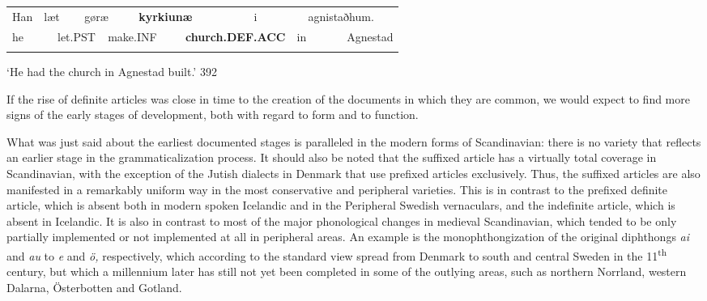 \begin{tabular}{llllllllllll}
\lsptoprule
Han & \multicolumn{2}{l}{læt

} & \multicolumn{2}{l}{gøræ

} & \multicolumn{2}{l}{{\bfseries kyrkiunæ}

} & \multicolumn{2}{l}{i

} & \multicolumn{2}{l}{agnistaðhum.

} & \\
\multicolumn{2}{l}{he

} & \multicolumn{2}{l}{let.PST

} & \multicolumn{2}{l}{make.INF

} & \multicolumn{2}{l}{{\bfseries church.DEF.ACC}

} & \multicolumn{2}{l}{in

} & \multicolumn{2}{l}{Agnestad

}\\
\lspbottomrule
\end{tabular}

\begin{styleTranslation}
‘He had the church in Agnestad built.’ 392

\end{styleTranslation}

\begin{styleBodytextC}
If the rise of definite articles was close in time to the creation of the documents in which they are common, we would expect to find more signs of the early stages of development, both with regard to form and to function.

\end{styleBodytextC}

\begin{styleBodytextC}
What was just said about the earliest documented stages is paralleled in the modern forms of Scandinavian: there is no variety that reflects an earlier stage in the grammaticalization process. It should also be noted that the suffixed article has a virtually total coverage in Scandinavian, with the exception of the Jutish dialects in Denmark that use prefixed articles exclusively. Thus, the suffixed articles are also manifested in a remarkably uniform way in the most conservative and peripheral varieties. This is in contrast to the prefixed definite article, which is absent both in modern spoken Icelandic and in the Peripheral Swedish vernaculars, and the indefinite article, which is absent in Icelandic. It is also in contrast to most of the major phonological changes in medieval Scandinavian, which tended to be only partially implemented or not implemented at all in peripheral areas. An example is the monophthongization of the original diphthongs \textit{ai} and \textit{au }to\textit{ e }and\textit{ ö,} respectively,\textit{ }which according to the standard view spread from Denmark to south and central Sweden in the 11\textsuperscript{th} century, but which a millennium later has still not yet been completed in some of the outlying areas, such as northern Norrland, western Dalarna, Österbotten and Gotland.  

\end{styleBodytextC}

